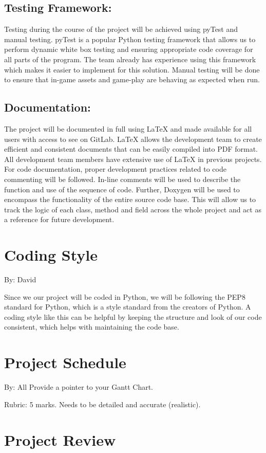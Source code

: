 \documentclass{article}
\begin{document}
\subsection*{Testing Framework:}

Testing during the course of the project will be achieved using pyTest and
manual testing. pyTest is a popular Python testing framework that allows us to
perform dynamic white box testing and ensuring appropriate code coverage for all
parts of the program. The team already has experience using this framework which
makes it easier to implement for this solution. Manual testing will be done to
ensure that in-game assets and game-play are behaving as expected when run.

\subsection*{Documentation:}

The project will be documented in full using LaTeX and made available for all
users with access to see on GitLab. LaTeX allows the development team to create
efficient and consistent documents that can be easily compiled into PDF format.
All development team members have extensive use of LaTeX in previous projects.
For code documentation, proper development practices related to code commenting
will be followed. In-line comments will be used to describe the function and use
of the sequence of code. Further, Doxygen will be used to encompass the
functionality of the entire source code base. This will allow us to track the
logic of each class, method and field across the whole project and act as a
reference for future development.

\section{Coding Style}
By: David

Since we our project will be coded in Python, we will be following the PEP8
standard for Python, which is a style standard from the creators of Python.
A coding style like this can be helpful by keeping the structure and look of
our code consistent, which helps with maintaining the code base.



\section{Project Schedule}
By: All
Provide a pointer to your Gantt Chart.

Rubric:  5 marks.  Needs to be detailed and accurate (realistic).

\section{Project Review}
%
\end{document}
